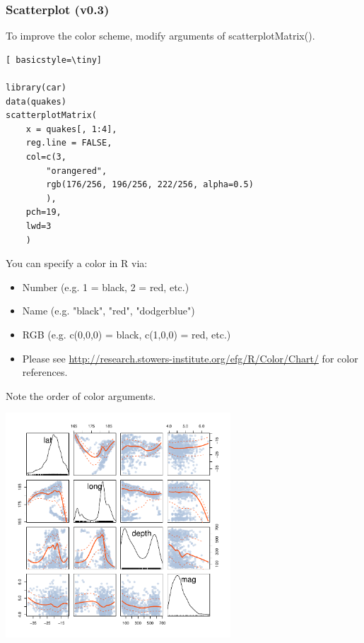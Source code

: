 \begin{frame}
\frametitle{Scatterplot (v0.3)}

To improve the color scheme, modify arguments of \ttfamily scatterplotMatrix().  
  		\begin{lstlisting}[ basicstyle=\tiny]

library(car)		
data(quakes)
scatterplotMatrix(
	x = quakes[, 1:4], 
	reg.line = FALSE,
	col=c(3,
		"orangered",
		rgb(176/256, 196/256, 222/256, alpha=0.5)
		), 
	pch=19,
	lwd=3
	)
		\end{lstlisting}
\normalfont
\framebreak
You can specify a color in R via: 
\begin{itemize}
	\item Number (e.g. 1 = black, 2 = red, etc.)
	\item Name (e.g. "black", "red", "dodgerblue")
	\item RGB (e.g. c(0,0,0) = black, c(1,0,0) = red, etc.)
	\item Please see \url{http://research.stowers-institute.org/efg/R/Color/Chart/} for color references. 
\end{itemize}

\noindent Note the order of color arguments. \normalfont
        \begin{center}
         \includegraphics[width=0.63\textwidth]{images/scatterPlot_v3.pdf}
        \end{center}
\end{frame}

